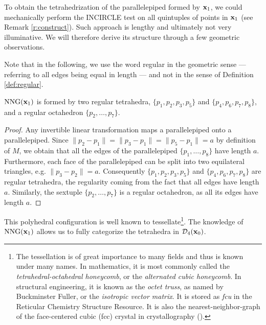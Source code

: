 To obtain the tetrahedrization of the parallelepiped formed by ${\mathbf{x}}_1$, we could mechanically perform the INCIRCLE test on all quintuples of points in ${\mathbf{x}}_1$ (see Remark \ref{r:construct}). Such approach is lengthy and ultimately not very illuminative. We will therefore derive its structure through a few geometric observations.

Note that in the following, we use the word regular in the geometric sense --- referring to all edges being equal in length --- and not in the sense of Definition \ref{def:regular}.
\begin{lemma}
	$\mathrm{NNG}({\mathbf{x}}_1)$ is formed by two regular tetrahedra, $\{p_1,p_2,p_3,p_5\}$ and $\{p_4,p_6,p_7,p_8\}$, and a regular octahedron $\{p_2,\dots,p_7\}$.
\end{lemma}
\begin{proof}
	Any invertible linear transformation maps a parallelepiped onto a parallelepiped. Since $\|p_2 - p_1\| = \|p_3-p_1\| = \|p_5-p_1\|=a$ by definition of $M$, we obtain that all the edges of the parallelepiped $\{p_1,\dots,p_8\}$ have length $a$. Furthermore, each face of the parallelepiped can be split into two equilateral triangles, e.g. $\|p_3-p_2\|=a$. Consequently $\{p_1,p_2,p_3,p_5\}$ and $\{p_4,p_6,p_7,p_8\}$ are regular tetrahedra, the regularity coming from the fact that all edges have length $a$. Similarly, the sextuple $\{p_2,\dots,p_7\}$ is a regular octahedron, as all its edges have length $a$.
\end{proof}

This polyhedral configuration is well known to tessellate\footnote{ The tessellation is of great importance to many fields and thus is known under many names. In mathematics, it is most commonly called the \textit{tetrahedral-octahedral honeycomb}, or the \textit{alternated cubic honeycomb}. In structural engineering, it is known as the \textit{octet truss}, as named by Buckminster Fuller, or the \textit{isotropic vector matrix}. It is stored as \textit{fcu} in the Reticular Chemistry Structure Resource\cite{RCSR}. It is also the nearest-neighbor-graph of the face-centered cubic (fcc) crystal in crystallography (\cite{Gabbrielli12}).  }. The knowledge of $\mathrm{NNG}({\mathbf{x}}_1)$ allows us to fully categorize the tetrahedra in $\mathcal D_4({\mathbf{x}}_0)$.

